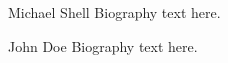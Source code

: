 \documentclass[journal]{IEEEtran}
\begin{document}
\ifCLASSOPTIONcaptionsoff
  \newpage
\fi





%
%
%
%
%



% 

\begin{IEEEbiography}{Michael Shell}
Biography text here.
\end{IEEEbiography}

\begin{IEEEbiographynophoto}{John Doe}
Biography text here.
\end{IEEEbiographynophoto}
\end{document}
